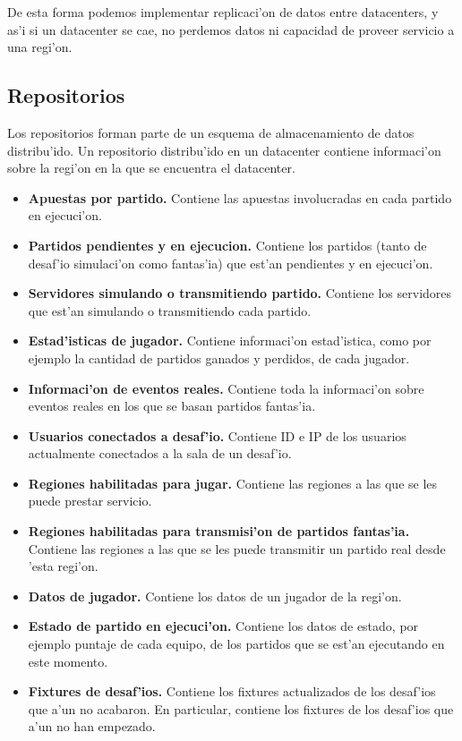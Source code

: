 \noindent
De esta forma podemos implementar replicaci'on de datos entre datacenters, y as'i si un datacenter se cae, no perdemos datos ni capacidad de proveer servicio a una regi'on.

\subsection{Repositorios}

Los repositorios forman parte de un esquema de almacenamiento de datos distribu'ido. Un repositorio distribu'ido en un datacenter contiene informaci'on sobre la regi'on en la que se encuentra el datacenter.

\begin{itemize}
	\item \textbf{Apuestas por partido.} Contiene las apuestas involucradas en cada partido en ejecuci'on.
	\item \textbf{Partidos pendientes y en ejecucion.} Contiene los partidos (tanto de desaf'io simulaci'on como fantas'ia) que est'an pendientes y en ejecuci'on.
	\item \textbf{Servidores simulando o transmitiendo partido.} Contiene los servidores que est'an simulando o transmitiendo cada partido.
	\item \textbf{Estad'isticas de jugador.} Contiene informaci'on estad'istica, como por ejemplo la cantidad de partidos ganados y perdidos, de cada jugador.
	\item \textbf{Informaci'on de eventos reales.} Contiene toda la informaci'on sobre eventos reales en los que se basan partidos fantas'ia.
	\item \textbf{Usuarios conectados a desaf'io.} Contiene ID e IP de los usuarios actualmente conectados a la sala de un desaf'io.
	\item \textbf{Regiones habilitadas para jugar.} Contiene las regiones a las que se les puede prestar servicio.
	\item \textbf{Regiones habilitadas para transmisi'on de partidos fantas'ia.} Contiene las regiones a las que se les puede transmitir un partido real desde 'esta regi'on.
	\item \textbf{Datos de jugador.} Contiene los datos de un jugador de la regi'on.
	\item \textbf{Estado de partido en ejecuci'on.} Contiene los datos de estado, por ejemplo puntaje de cada equipo, de los partidos que se est'an ejecutando en este momento.
	\item \textbf{Fixtures de desaf'ios.} Contiene los fixtures actualizados de los desaf'ios que a'un no acabaron. En particular, contiene los fixtures de los desaf'ios que a'un no han empezado.

\end{itemize}
